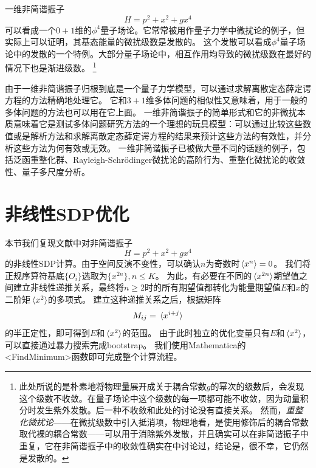 \documentclass[oneside]{fduthesis}
\def\texttt#1{<#1>}%
\begin{document}
一维非简谐振子
\begin{equation}
    H = p^2 + x^2 + g x^4
\end{equation}
可以看成一个$0+1$维的$\phi^4$量子场论。它常常被用作量子力学中微扰论的例子，但实际上可以证明，其基态能量的微扰级数是发散的\cite{PhysRev.184.1231}。
这个发散可以看成$\phi^4$量子场论中的发散的一个特例。大部分量子场论中，相互作用均导致的微扰级数在最好的情况下也是渐进级数\cite{Jackiw_effective}。%
\footnote{此处所说的是朴素地将物理量展开成关于耦合常数$g$的幂次的级数后，会发现这个级数不收敛。在量子场论中这个级数的每一项都可能不收敛，因为动量积分时发生紫外发散。后一种不收敛和此处的讨论没有直接关系。
然而，\emph{重整化微扰论}——在微扰级数中引入抵消项，物理地看，是使用修饰后的耦合常数取代裸的耦合常数——可以用于消除紫外发散，并且确实可以在非简谐振子中重复，它在非简谐振子中的收敛性确实在\parencite{Bender-1970uz}中讨论过，结论是，很不幸，它仍然是发散的。}

由于一维非简谐振子归根到底是一个量子力学模型，可以通过求解离散定态薛定谔方程的方法精确地处理它。
它和$3+1$维多体问题的相似性又意味着，用于一般的多体问题的方法也可以用在它上面。
一维非简谐振子的简单形式和它的非微扰本质意味着它是测试多体问题研究方法的一个理想的玩具模型：可以通过比较这些数值或是解析方法和求解离散定态薛定谔方程的结果来预计这些方法的有效性，并分析这些方法为何有效或无效。
一维非简谐振子已被做大量不同的话题的例子，包括泛函重整化群\cite{Nagy-2010fv}、Rayleigh-Schrödinger微扰论的高阶行为\cite{bender199041}、重整化微扰论的收敛性\cite{Bender-1970uz}、量子多尺度分析\cite{Bender_1996}。

\section{非线性SDP优化}\label{sec:nonlinear-sdp-oscillator}

本节我们复现文献\parencite{han_matrix}中对非简谐振子
\begin{equation}
    H = p^2 + x^2 + g x^4
    \label{eq:anharmonic-hamiltonian}
\end{equation}
的非线性SDP计算。由于空间反演不变性，可以确认$n$为奇数时$\expval*{x^n} = 0$。
我们将正规序算符基底$\{O_i\}$选取为$\{x^{2n}\}, n \leq K$。
为此，有必要在不同的$\expval*{x^{2n}}$期望值之间建立非线性递推关系，最终将$n \geq 2$时的所有期望值都转化为能量期望值$E$和$x$的二阶矩$\expval*{x^2}$的多项式。
建立这种递推关系之后，根据矩阵
\begin{equation}
    M_{ij} = \expval*{x^{i + j}}
\end{equation}
的半正定性，即可得到$E$和$\expval*{x^2}$的范围。
由于此时独立的优化变量只有$E$和$\expval*{x^2}$，可以直接通过暴力搜索完成bootstrap。
我们使用Mathematica的\texttt{FindMinimum}函数即可完成整个计算流程。
\end{document}
